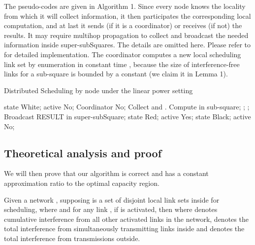 \documentclass[journal]{IEEEtran}
\begin{document}
The pseudo-codes are given in Algorithm 1. Since every node knows the locality from which it will collect information, it then participates the corresponding local computation, and at last it sends (if it is a coordinator) or receives (if not) the results. It may require multihop propagation to collect and broadcast the needed information inside super-subSquares. The details are omitted here. Please refer to \cite{brar-icdcs08} for detailed implementation.
The coordinator computes a new local scheduling link set by enumeration  in constant time , because the size of interference-free links for a sub-square is bounded by a constant (we claim it in Lemma 1).

\begin{algorithm}[htpb]
\caption{Distributed Scheduling by node  under the linear power setting}
\label{alg1}
\begin{algorithmic}[1]
\STATE state  White; active  No; Coordinator  No;
        \ENDIF
            \STATE Collect  and .
            \STATE Compute  in sub-square;
            \IF {}
                \STATE ;
                \ELSE
                    \STATE ;
            \ENDIF
            \STATE Broadcast RESULT in super-subSquare;
        \ENDIF
                \IF{ }
                    \STATE state  Red; active  Yes;
                \ELSE
                    \STATE state  Black; active  No;
                \ENDIF
            \ENDIF
        \ENDIF
     \end{algorithmic}
\end{algorithm}


\subsection{Theoretical analysis and proof}
We will then prove that our algorithm is correct and has a constant approximation ratio to the optimal capacity region.

Given a network , supposing   is a set of disjoint local link sets inside for scheduling, where  and 
for any link , if  is activated, then
{\small{}}
where  denotes cumulative interference from all other activated links in the network,  denotes the total interference from simultaneously transmitting
links inside  and  denotes the total interference from transmissions outside.
\end{document}
